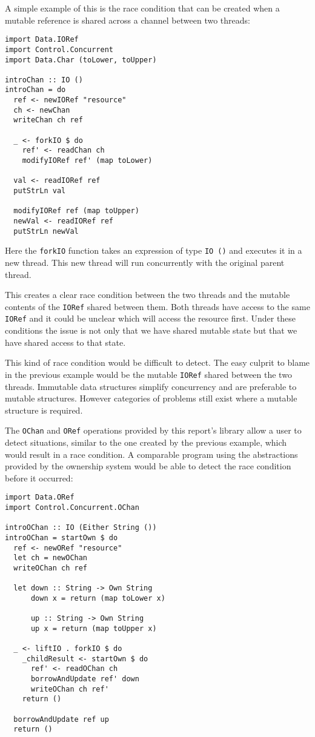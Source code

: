 \documentclass[onehalf,11pt]{beavtex}
\begin{document}
\newpage

A simple example of this is the race condition that can be created when a
mutable reference is shared across a channel between two threads:

\begin{lstlisting}
import Data.IORef
import Control.Concurrent
import Data.Char (toLower, toUpper)

introChan :: IO ()
introChan = do
  ref <- newIORef "resource"
  ch <- newChan
  writeChan ch ref

  _ <- forkIO $ do
    ref' <- readChan ch
    modifyIORef ref' (map toLower)

  val <- readIORef ref
  putStrLn val

  modifyIORef ref (map toUpper)
  newVal <- readIORef ref
  putStrLn newVal
\end{lstlisting}

Here the \texttt{forkIO} function takes an expression of type \texttt{IO ()}
and executes it in a new thread.
This new thread will run concurrently with the original parent thread.

This creates a clear race condition between the two threads and the mutable
contents of the \texttt{IORef} shared between them.
Both threads have access to the same \texttt{IORef} and it could be unclear
which will access the resource first.  Under these conditions the issue is not
only that we have shared mutable state but that we have shared access to that
state.

This kind of race condition would be difficult to detect. 
The easy culprit to blame in the previous example would be the
mutable \texttt{IORef} shared between the two threads.
Immutable data structures simplify concurrency and are preferable to
mutable structures. However categories of problems still exist where a
mutable structure is required.

The \texttt{OChan} and \texttt{ORef} operations provided by this report's library
allow a user to detect situations, similar to the one created by the previous
example, which would result in a race condition.
A comparable program using the abstractions provided by the ownership system
would be able to detect the race condition before it occurred:

\begin{lstlisting}
import Data.ORef
import Control.Concurrent.OChan

introOChan :: IO (Either String ())
introOChan = startOwn $ do
  ref <- newORef "resource"
  let ch = newOChan
  writeOChan ch ref

  let down :: String -> Own String
      down x = return (map toLower x)

      up :: String -> Own String
      up x = return (map toUpper x)

  _ <- liftIO . forkIO $ do
    _childResult <- startOwn $ do
      ref' <- readOChan ch
      borrowAndUpdate ref' down
      writeOChan ch ref'
    return ()

  borrowAndUpdate ref up
  return ()
\end{lstlisting}
\end{document}

